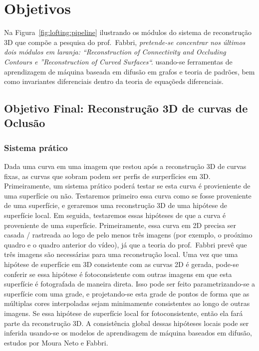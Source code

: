 \documentclass[a4paper,titlepage]{article}
\begin{document}
\section{Objetivos}

Na Figura~\ref{fig:lofting:pipeline} ilustrando os módulos do sistema de
reconstrução 3D que compõe a pesquisa do prof.\ Fabbri, \emph{pretende-se concentrar
nos últimos dois módulos em laranja: ``Reconstruction of Connectivity and
Occluding Contours e ''Reconstruction of Curved Surfaces``.}
usando-se ferramentas de aprendizagem de máquina baseada em
difusão em grafos e teoria de padrões, bem como invariantes diferenciais dentro
da teoria de equaçõeds diferenciais.


\subsection{Objetivo Final: Reconstrução 3D de curvas de Oclusão}

\subsubsection{Sistema prático}
Dada uma curva em uma imagem que restou após a reconstrução 3D de curvas fixas,
as curvas que sobram podem ser perfis de surperfícies em 3D. Primeiramente, um
sistema prático poderá testar se esta curva é provieniente de uma superfície ou
não.
Testaremos primeiro essa curva como se fosse proveniente de uma superfície, e
geraremos uma reconstrução 3D de uma hipótese de superfície local. Em seguida,
testaremos essas hipóteses de que a curva é proveniente de uma superfície.
Primeiramente, essa curva em 2D precisa ser casada / rastreada ao logo de pelo
menos três imagens (por exemplo, o proóximo quadro e o quadro anterior do
vídeo), já que a teoria do prof.\ Fabbri prevê que três imagens são necessárias
para uma reconstrução local. Uma vez que uma hipótese de superfície em 3D
consistente com as curvas 2D é gerada, pode-se conferir se essa hipótese é
fotoconsistente com outras imagens em que esta superfície é fotografada de
maneira direta. Isso pode ser feito parametrizando-se a superfície com uma
grade, e projetando-se esta grade de pontos de forma que as múltiplas cores
interpoladas sejam minimamente consistentes ao longo de outras imagens.
Se essa hipótese de superfície local for fotoconsistente, então ela fará parte
da reconstrução 3D. A consistência global dessas hipóteses locais pode ser
inferida usando-se os modelos de aprendisagem de máquina baseados em difusão,
estudos por Moura Neto e Fabbri. 
\end{document}
